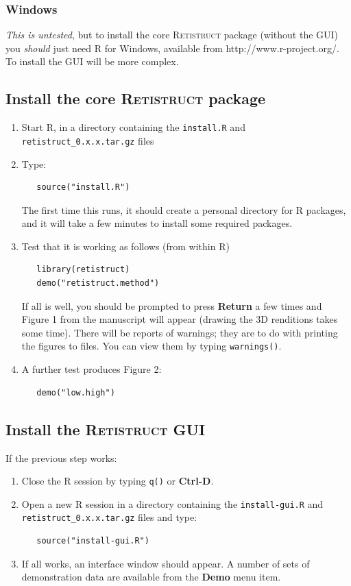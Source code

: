 \documentclass{article}
\begin{document}
\subsubsection{Windows}

\emph{This is untested}, but to install the core \textsc{Retistruct} package (without
the GUI) you \emph{should} just need R for Windows, available from
http://www.r-project.org/. To install the GUI will be more complex.

\subsection{Install the core \textsc{Retistruct} package}

\begin{enumerate}
\item Start \textsc{R}, in a directory containing the \texttt{install.R} and
   \texttt{retistruct\_0.x.x.tar.gz} files
 \item  Type:
\begin{verbatim}
   source("install.R")
\end{verbatim}
   The first time this runs, it should create a personal directory for
   R packages, and it will take a few minutes to install some required
   packages.
 \item Test that it is working as follows (from within R)
\begin{verbatim}
   library(retistruct)
   demo("retistruct.method")
\end{verbatim}
   If all is well, you should be prompted to press \textbf{Return} a
   few times and Figure 1 from the manuscript will appear (drawing the
   3D renditions takes some time). There will be reports of warnings;
   they are to do with printing the figures to files. You can view
   them by typing \texttt{warnings()}.
 \item A further test produces Figure 2:
\begin{verbatim}
   demo("low.high")
\end{verbatim}
\end{enumerate}

\subsection{Install the \textsc{Retistruct} GUI}
\label{retistruct-manual:sec:inst-retistr-gui}

If the previous step works:
\begin{enumerate}
\item Close the R session by typing \texttt{q()} or \textbf{Ctrl-D}.
\item Open a new R session in a directory containing the
  \texttt{install-gui.R} and \texttt{retistruct\_0.x.x.tar.gz} files and
  type:
\begin{verbatim}
   source("install-gui.R")
\end{verbatim}
\item If all works, an interface window should appear. A number of
  sets of demonstration data are available from the \textbf{Demo} menu item.
\end{enumerate}
\end{document}
